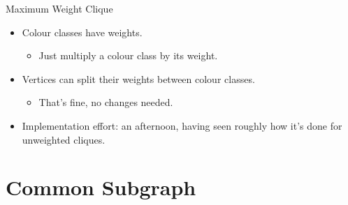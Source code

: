 \documentclass{beamer}
\begin{document}
\begin{frame}[fragile]{Maximum Weight Clique}
    \begin{itemize}
        \item Colour classes have weights.
            \begin{itemize}
                \item Just multiply a colour class by its weight.
            \end{itemize}
        \item Vertices can split their weights between colour classes.
            \begin{itemize}
                \item That's fine, no changes needed.
            \end{itemize}
        \item Implementation effort: an afternoon, having seen roughly how it's done for unweighted
            cliques.
    \end{itemize}
\end{frame}

\section{Common Subgraph}
\end{document}
